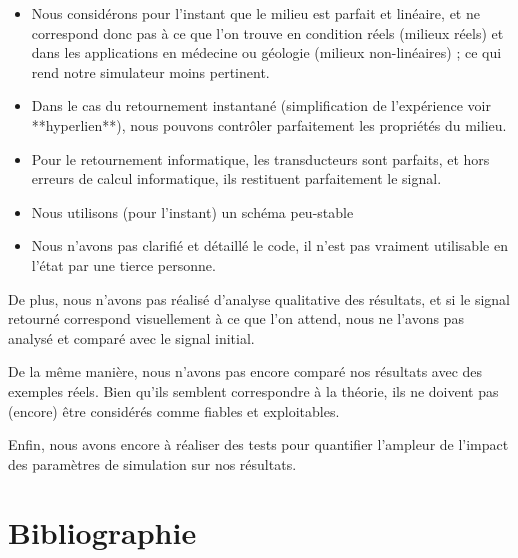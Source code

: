 \documentclass[11pt, a4paper]{article}
\begin{document}
\begin{itemize}
    \item Nous considérons pour l'instant que le milieu est parfait et linéaire, et ne correspond donc pas à ce que l'on trouve en condition réels (milieux réels) et dans les applications en médecine ou géologie (milieux non-linéaires) ; ce qui rend notre simulateur moins pertinent. 

    \item Dans le cas du retournement instantané (simplification de l'expérience voir **hyperlien**), nous pouvons contrôler parfaitement les propriétés du milieu. 

    \item Pour le retournement informatique, les transducteurs sont parfaits, et hors erreurs de calcul informatique, ils restituent parfaitement le signal. 

    \item Nous utilisons (pour l'instant) un schéma peu-stable 

    \item Nous n'avons pas clarifié et détaillé le code, il n'est pas vraiment utilisable en l'état par une tierce personne. 
\end{itemize}
  

De plus, nous n'avons pas réalisé d'analyse qualitative des résultats, et si le signal retourné correspond visuellement à ce que l'on attend, nous ne l'avons pas analysé et comparé avec le signal initial. 

De la même manière, nous n'avons pas encore comparé nos résultats avec des exemples réels. Bien qu'ils semblent correspondre à la théorie, ils ne doivent pas (encore) être considérés comme fiables et exploitables. 

Enfin, nous avons encore à réaliser des tests pour quantifier l'ampleur de l'impact des paramètres de simulation sur nos résultats. 

\section{Bibliographie}
\end{document}
